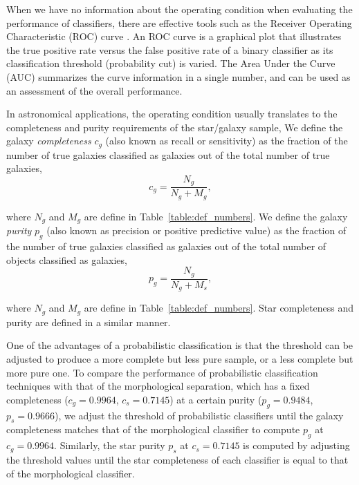 \documentclass[useAMS,usenatbib]{mn2e}
\begin{document}
When we have no information about the operating condition
when evaluating the performance of classifiers,
there are effective tools such as
the Receiver Operating Characteristic (ROC) curve
\citep{swets2000better}.
An ROC curve is a graphical plot that illustrates the true positive rate
versus the false positive rate of a binary classifier
as its classification threshold (probability cut) is varied.
The Area Under the Curve (AUC) summarizes the curve information
in a single number,
and can be used as an assessment of the overall performance.

In astronomical applications,
the operating condition usually translates to
the completeness and purity requirements of the star/galaxy sample,
We define the galaxy \textit{completeness}
$c_g$ (also known as recall or sensitivity) as
the fraction of the number of true galaxies classified as galaxies
out of the total number of true galaxies,
\begin{equation}
c_g = \frac{N_g}{N_g + M_g},
\end{equation}

\noindent
where $N_g$ and $M_g$ are define in Table~\ref{table:def_numbers}.
We define the galaxy \textit{purity} $p_g$ (also known as precision
or positive predictive value)
as the fraction of the number of true galaxies classified as galaxies
out of the total number of objects classified as galaxies, 
\begin{equation}
p_g = \frac{N_g}{N_g + M_s},
\end{equation}

\noindent
where $N_g$ and $M_g$ are define in Table~\ref{table:def_numbers}.
Star completeness and purity are defined in a similar manner.


One of the advantages of a probabilistic classification is
that the threshold can be adjusted to produce
a more complete but less pure sample,
or a less complete but more pure one.
To compare the performance of probabilistic classification techniques
with that of the morphological separation,
which has a fixed completeness ($c_g = 0.9964$, $c_s = 0.7145$)
at a certain purity ($p_g = 0.9484$, $p_s = 0.9666$),
we adjust the threshold of probabilistic classifiers
until the galaxy completeness matches that of the morphological classifier
to compute $p_{g}$ at $c_g=0.9964$.
Similarly, the star purity $p_{s}$ at $c_{s}=0.7145$
is computed by adjusting the threshold values
until the star completeness of each classifier is equal to
that of the morphological classifier.
\end{document}
